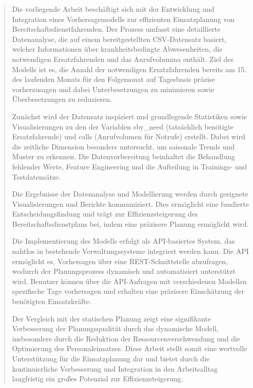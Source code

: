 \documentclass[%
pdftex,
oneside,			%
11pt,				%
parskip=half,		%
headheight = 12pt,	%
headsepline,		%
footsepline,		%
footheight = 16pt,	%
abstracton,		%
DIV=calc,		%
BCOR=8mm,		%
headinclude=false,	%
footinclude=false,	%
listof=totoc,		%
toc=bibliography,	%
]{scrreprt}	%
\begin{document}
\renewcommand{\abstractname}{Abstract}
\begin{abstract}


    Die vorliegende Arbeit beschäftigt sich mit der Entwicklung und Integration eines Vorhersagemodells zur effizienten Einsatzplanung von Bereitschaftsdienstfahrenden. 
    Der Prozess umfasst eine detaillierte Datenanalyse, die auf einem bereitgestellten CSV-Datensatz basiert, welcher Informationen über krankheitsbedingte Abwesenheiten, die notwendigen Ersatzfahrenden und das Anrufvolumina enthält. 
    Ziel des Modells ist es, die Anzahl der notwendigen Ersatzfahrenden bereits am 15. des laufenden Monats für den Folgemonat auf Tagesbasis präzise vorherzusagen und dabei Unterbesetzungen zu minimieren sowie Überbesetzungen zu reduzieren. 

    Zunächst wird der Datensatz inspiziert und grundlegende Statistiken sowie Visualisierungen zu den der Variablen sby\_need (tatsächlich benötigte Ersatzfahrende) und calls (Anrufvolumen für Notrufe) erstellt. 
    Dabei wird die zeitliche Dimension besonders untersucht, um saisonale Trends und Muster zu erkennen. 
    Die Datenvorbereitung beinhaltet die Behandlung fehlender Werte, Feature Engineering und die Aufteilung in Trainings- und Testdatensätze.

    Die Ergebnisse der Datenanalyse und Modellierung werden durch geeignete Visualisierungen und Berichte kommuniziert. 
    Dies ermöglicht eine fundierte Entscheidungsfindung und trägt zur Effizienzsteigerung des Bereitschaftsdienstplans bei, indem eine präzisere Planung ermöglicht wird. 

    Die Implementierung des Modells erfolgt als API-basiertes System, das nahtlos in bestehende Verwaltungssysteme integriert werden kann. 
    Die API ermöglicht es, Vorhersagen über eine REST-Schnittstelle abzufragen, wodurch der Planungsprozess dynamisch und automatisiert unterstützt wird. 
    Benutzer können über die API-Anfragen mit verschiedenen Modellen spezifische Tage vorhersagen und erhalten eine präzisere Einschätzung der benötigten Einsatzkräfte. 

    Der Vergleich mit der statischen Planung zeigt eine signifikante Verbesserung der Planungsqualität durch das dynamische Modell, insbesondere durch die Reduktion der Ressourcenverschwendung und die Optimierung des Personaleinsatzes. 
    Diese Arbeit stellt somit eine wertvolle Unterstützung für die Einsatzplanung dar und bietet durch die kontinuierliche Verbesserung und Integration in den Arbeitsalltag langfristig ein großes Potenzial zur Effizienzsteigerung.

\end{abstract}
\end{document}
